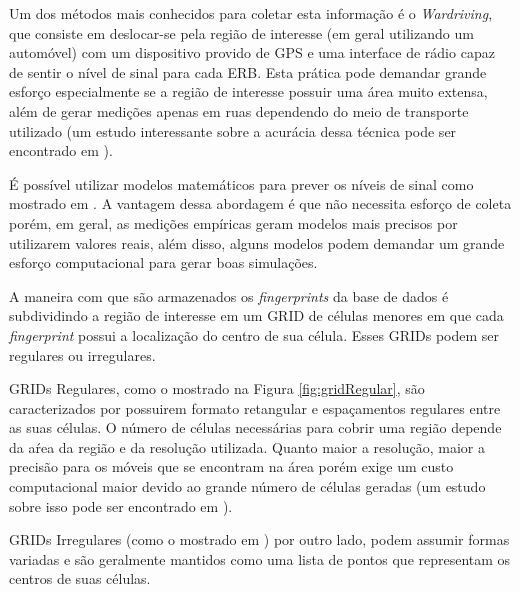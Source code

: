 \documentclass[12pt]{article}
\newcounter{subsubsubsection}[subsubsection]
\begin{document}
				Um dos métodos mais conhecidos para coletar esta informação é o \textit{Wardriving}, que consiste em deslocar-se pela região de interesse (em geral utilizando um automóvel) com um dispositivo provido de GPS e uma interface de rádio capaz de sentir o nível de sinal para cada ERB. Esta prática pode demandar grande esforço especialmente se a região de interesse possuir uma área muito extensa, além de gerar medições apenas em ruas dependendo do meio de transporte utilizado (um estudo interessante sobre a acurácia dessa técnica pode ser encontrado em \cite{wardriving2010}). 
				
				É possível utilizar modelos matemáticos para prever os níveis de sinal como mostrado em \cite{teseRobson2014}. A vantagem dessa abordagem é que não necessita esforço de coleta porém, em geral, as medições empíricas geram modelos mais precisos por utilizarem valores reais, além disso, alguns modelos podem demandar um grande esforço computacional para gerar boas simulações.

                \label{sec:treinamentoGRIDs}

				A maneira com que são armazenados os \textit{fingerprints} da base de dados é subdividindo a região de interesse em um GRID de células menores em que cada \textit{fingerprint} possui a localização do centro de sua célula. Esses GRIDs podem ser regulares ou irregulares.
				
				GRIDs Regulares, como o mostrado na Figura \ref{fig:gridRegular}, são caracterizados por possuirem formato retangular e espaçamentos regulares entre as suas células. O número de células necessárias para cobrir uma região depende da aŕea da região e da resolução utilizada. Quanto maior a resolução, maior a precisão para os móveis que se encontram na área porém exige um custo computacional maior devido ao grande número de células geradas (um estudo sobre isso pode ser encontrado em \cite{gridResolutionImpact2011}). 
				
				GRIDs Irregulares (como o mostrado em \cite{unevenGridFingerprinting2015}) por outro lado, podem assumir formas variadas e são geralmente mantidos como uma lista de pontos que representam os centros de suas células.
				
\end{document}
